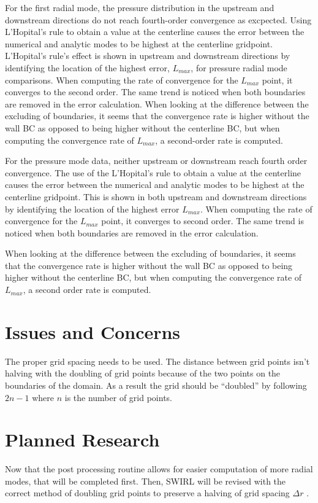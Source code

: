 \documentclass[a4paper]{report}
\begin{document}
For the first radial mode, the pressure distribution in the upstream and downstream directions 
do not reach fourth-order convergence as excpected. Using L’Hopital’s rule to obtain 
a value at the centerline causes the error between the numerical and analytic modes 
to be highest at the centerline gridpoint. L’Hopital’s rule’s effect is shown in upstream and downstream directions by identifying the
location of the highest error, $L_{max}$, for pressure radial mode comparisons. When computing
the rate of convergence for the  $L_{max}$ point, it converges to the second order. The
same trend is noticed when both boundaries are removed in the error calculation. When
looking at the difference between the excluding of boundaries, it seems that the convergence
rate is higher without the wall BC as opposed to being higher without the centerline
BC, but when computing the convergence rate of  $L_{max}$, a second-order rate is computed.         

For the pressure mode data, neither upstream or downstream reach fourth order convergence.
The use of the L'Hopital's rule to obtain a value at the centerline causes the 
error between the numerical and analytic modes to be highest at the centerline
gridpoint. This is shown in both upstream and downstream directions by identifying
the location of the highest error $L_{max}$. When computing the rate of convergence
for the $L_{max}$ point, it converges to second order. The same trend is noticed when 
both boundaries are removed in the error calculation. 

When looking at the difference between the excluding of boundaries, it seems that 
the convergence rate is higher without the wall BC as opposed to being higher without 
the centerline BC, but when computing the convergence rate of $L_{max}$, a second
order rate is computed. 

\section{Issues and Concerns}
The proper grid spacing needs to be used. The distance between grid points isn't
halving with the doubling of grid points because of the two points on the boundaries 
of the domain. As a result the grid should be ``doubled'' by following $2n - 1$ 
where $n$ is the number of grid points.

\section{Planned Research}
Now that the post processing routine allows for easier computation of more radial
modes, that will be completed first. Then, SWIRL will be revised with the  correct method of doubling grid points to preserve a halving of 
 grid spacing $\Delta r$ .  
\end{document}

